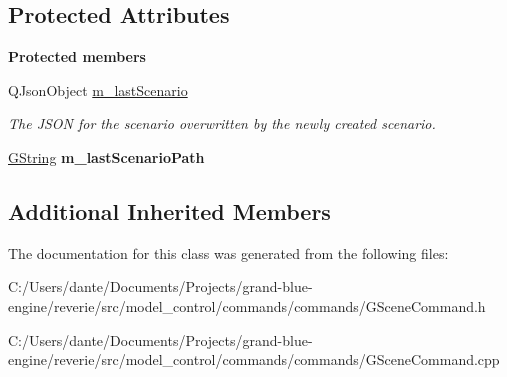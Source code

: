 \subsection*{Protected Attributes}
\begin{Indent}\textbf{ Protected members}\par
\begin{DoxyCompactItemize}
\item 
\mbox{\label{classrev_1_1_add_scenario_command_a7ef4405cb3af6a28a2541d1a343db271}} 
Q\+Json\+Object \mbox{\hyperlink{classrev_1_1_add_scenario_command_a7ef4405cb3af6a28a2541d1a343db271}{m\+\_\+last\+Scenario}}
\begin{DoxyCompactList}\small\item\em The J\+S\+ON for the scenario overwritten by the newly created scenario. \end{DoxyCompactList}\item 
\mbox{\label{classrev_1_1_add_scenario_command_a9d51b3d9f3af7e10c52309d0f7a05833}} 
\mbox{\hyperlink{classrev_1_1_g_string}{G\+String}} {\bfseries m\+\_\+last\+Scenario\+Path}
\end{DoxyCompactItemize}
\end{Indent}
\subsection*{Additional Inherited Members}


The documentation for this class was generated from the following files\+:\begin{DoxyCompactItemize}
\item 
C\+:/\+Users/dante/\+Documents/\+Projects/grand-\/blue-\/engine/reverie/src/model\+\_\+control/commands/commands/G\+Scene\+Command.\+h\item 
C\+:/\+Users/dante/\+Documents/\+Projects/grand-\/blue-\/engine/reverie/src/model\+\_\+control/commands/commands/G\+Scene\+Command.\+cpp\end{DoxyCompactItemize}
